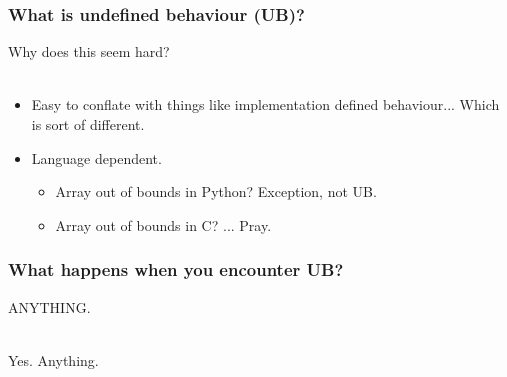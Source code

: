 \documentclass{beamer}
\begin{document}
\begin{frame}
  \frametitle{What is undefined behaviour (UB)?}

  Why does this seem hard?\\~

  \pause
  \begin{itemize}
\item Easy to conflate with things like implementation defined
  behaviour... Which is sort of different.
  \pause
\item Language dependent.
  \begin{itemize}
  \item  Array out of bounds in Python? Exception, not UB.
    \pause
  \item Array out of bounds in C? ... Pray.
  \end{itemize}
  \end{itemize}
\end{frame}

\begin{frame}
  \frametitle{What happens when you encounter UB?}

  \pause

  {\huge ANYTHING.}\\~

  \pause

  {\huge Yes. \pause Anything.}\\~
  
\end{frame}
\end{document}
